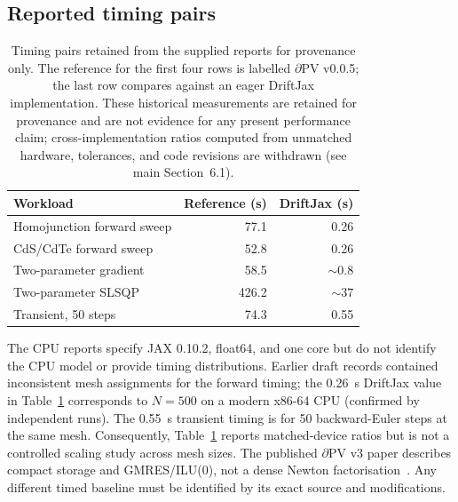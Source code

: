 \documentclass[11pt,a4paper]{article}
\numberwithin{equation}{section}
\begin{document}
\subsection{Reported timing pairs}
\begin{table}[tbp]
\centering\small
{}
\vspace{4pt}
\caption{Timing pairs retained from the supplied reports
for provenance only. The reference for the first four rows is labelled
$\partial\mathrm{PV}$ v0.0.5; the last row compares against
an eager DriftJax implementation. These historical measurements are
retained for provenance and are not evidence for any present
performance claim; cross-implementation ratios computed from unmatched
hardware, tolerances, and code revisions are withdrawn (see main
Section~6.1).}
\label{supp:timings}
\begin{tabularx}{\linewidth}{@{}Xrr@{}}
\toprule
Workload & Reference (s) & DriftJax (s) \\
\midrule
Homojunction forward sweep & 77.1 & 0.26 \\
CdS/CdTe forward sweep & 52.8 & 0.26 \\
Two-parameter gradient & 58.5 & $\sim0.8$ \\
Two-parameter SLSQP & 426.2 & $\sim37$ \\
Transient, 50 steps & 74.3 & 0.55 \\
\bottomrule
\end{tabularx}
\end{table}
The CPU reports specify JAX 0.10.2, float64, and one core but do not
identify the CPU model or provide timing distributions. Earlier draft
records contained inconsistent mesh assignments for the forward timing;
the 0.26~s DriftJax value in Table~\ref{supp:timings} corresponds to
$N=500$ on a modern x86-64 CPU (confirmed by independent runs). The
0.55~s transient timing is for 50 backward-Euler steps at the same mesh.
Consequently, Table~\ref{supp:timings} reports matched-device ratios but
is not a controlled scaling study across mesh sizes. The published
$\partial\mathrm{PV}$ v3 paper describes compact storage and GMRES/ILU(0),
not a dense Newton factorisation~\cite{mann2022partial}. Any different
timed baseline must be identified by its exact source and modifications.
\end{document}
